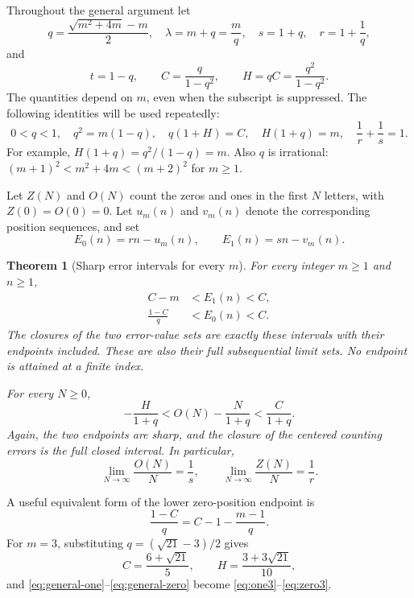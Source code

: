 \documentclass[11pt]{article}
\numberwithin{equation}{section}
\newtheorem{theorem}{Theorem}[section]
\theoremstyle{definition}
\theoremstyle{remark}
\begin{document}
Throughout the general argument let
\begin{equation}\label{eq:parameters}
q=\frac{\sqrt{m^2+4m}-m}{2},\quad
\lambda=m+q=\frac mq,\quad
s=1+q,\quad r=1+\frac1q,
\end{equation}
and
\begin{equation}\label{eq:CH}
t=1-q,\qquad C=\frac{q}{1-q^2},\qquad
H=qC=\frac{q^2}{1-q^2}.
\end{equation}
The quantities depend on $m$, even when the subscript is suppressed.
The following identities will be used repeatedly:
\begin{equation}\label{eq:identities}
0<q<1,\quad q^2=m(1-q),\quad
q(1+H)=C,\quad H(1+q)=m,\quad
\frac1r+\frac1s=1.
\end{equation}
For example, $H(1+q)=q^2/(1-q)=m$. Also $q$ is irrational:
$(m+1)^2<m^2+4m<(m+2)^2$ for $m\ge1$.

Let $Z(N)$ and $O(N)$ count the zeros and ones in the first $N$ letters,
with $Z(0)=O(0)=0$. Let $u_m(n)$ and $v_m(n)$ denote the corresponding
position sequences, and set
\[
E_0(n)=rn-u_m(n),\qquad E_1(n)=sn-v_m(n).
\]

\begin{theorem}[Sharp error intervals for every $m$]\label{thm:general}
For every integer $m\ge1$ and $n\ge1$,
\begin{align}
C-m&<E_1(n)<C,\label{eq:general-one}\\
\frac{1-C}{q}&<E_0(n)<C.\label{eq:general-zero}
\end{align}
The closures of the two error-value sets are exactly these intervals
with their endpoints included. These are also their full subsequential
limit sets. No endpoint is attained at a finite index.

For every $N\ge0$,
\begin{equation}\label{eq:general-density}
-\frac{H}{1+q}<O(N)-\frac{N}{1+q}<\frac{C}{1+q}.
\end{equation}
Again, the two endpoints are sharp, and the closure of the centered
counting errors is the full closed interval. In particular,
\[
\lim_{N\to\infty}\frac{O(N)}N=\frac1s,\qquad
\lim_{N\to\infty}\frac{Z(N)}N=\frac1r.
\]
\end{theorem}

A useful equivalent form of the lower zero-position endpoint is
\begin{equation}\label{eq:zero-lower-alt}
\frac{1-C}{q}=C-1-\frac{m-1}{q}.
\end{equation}
For $m=3$, substituting $q=(\sqrt{21}-3)/2$ gives
\[
C=\frac{6+\sqrt{21}}5,\qquad
H=\frac{3+3\sqrt{21}}{10},
\]
and \eqref{eq:general-one}--\eqref{eq:general-zero} become
\eqref{eq:one3}--\eqref{eq:zero3}.
\end{document}
